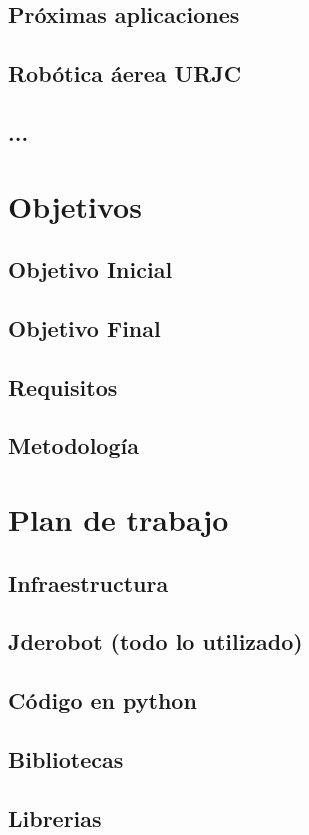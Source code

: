 \documentclass{book}
\begin{document}
\section{Próximas aplicaciones}
\section{Robótica áerea URJC}
\section{...}

\chapter{Objetivos}
\section{Objetivo Inicial}
\section{Objetivo Final}
\section{Requisitos}
\section{Metodología}

\chapter{Plan de trabajo}
\section{Infraestructura}
\section{Jderobot (todo lo utilizado)}
\section{Código en python}
\section{Bibliotecas}
\section{Librerias}
\end{document}
